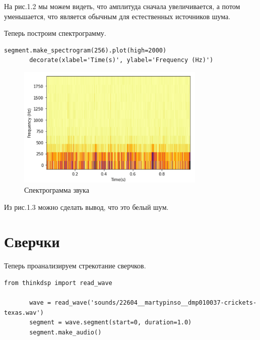 \documentclass[a4paper,12pt]{report}
\begin{document}
    На рис.1.2 мы можем видеть, что амплитуда сначала увеличивается, а потом уменьшается, что является обычным для естественных источников шума.
    
    Теперь построим спектрограмму.
\begin{lstlisting}[caption=Получение спектрограммы]
       segment.make_spectrogram(256).plot(high=2000)
       decorate(xlabel='Time(s)', ylabel='Frequency (Hz)')
\end{lstlisting}
\begin{figure}[H]
        \centering
        \includegraphics[width=0.8\textwidth]{fig1-3.PNG}
        \caption{Спектрограмма звука}
        \label{fig:fig1-3}
\end{figure}

    Из рис.1.3 можно сделать вывод, что это белый шум.
\section{Сверчки}
    Теперь проанализируем стрекотание сверчков.
\begin{lstlisting}[caption=Выделение сегмента]
       from thinkdsp import read_wave

       wave = read_wave('sounds/22604__martypinso__dmp010037-crickets-texas.wav')
       segment = wave.segment(start=0, duration=1.0)
       segment.make_audio()
\end{lstlisting}
\end{document}
